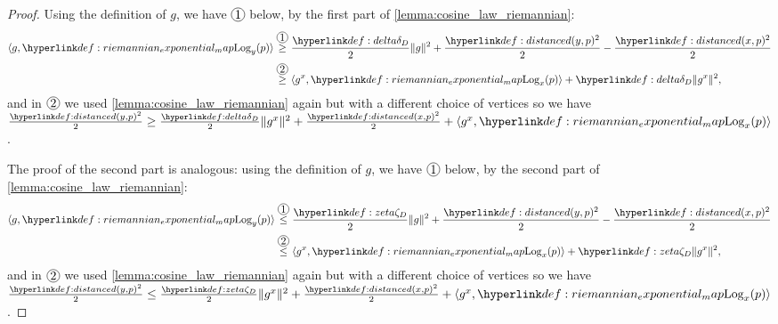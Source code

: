 \documentclass[12pt]{alt2021}
\newcommand{\norm}[1]{\| #1 \|}
\newcommand{\innp}[1]{\langle #1 \rangle}
\begin{document}
\begin{proof}
    Using the definition of $g$, we have $\circled{1}$ below, by the first part of \cref{lemma:cosine_law_riemannian}:
    \begin{align*}
     \begin{aligned}
         \innp{g, \exponinv{y}(p)} &\circled{1}[\geq] \frac{\delta{D}}{2}\norm{g}^2 + \frac{\dist(y, p)^2}{2} - \frac{\dist(x, p)^2}{2} \\
         & \circled{2}[\geq] \innp{g^x, \exponinv{x}(p)} +\delta{D}\norm{g^x}^2,
     \end{aligned}
    \end{align*}
    and in $\circled{2}$ we used \cref{lemma:cosine_law_riemannian} again but with a different choice of vertices so we have $\frac{\dist(y, p)^2}{2} \geq \frac{\delta{D}}{2} \norm{g^x}^2 + \frac{\dist(x, p)^2}{2} + \innp{g^x, \exponinv{x}(p)}$.

    The proof of the second part is analogous: using the definition of $g$, we have $\circled{1}$ below, by the second part of \cref{lemma:cosine_law_riemannian}:
    \begin{align*}
     \begin{aligned}
         \innp{g, \exponinv{y}(p)} &\circled{1}[\leq] \frac{\zeta{D}}{2}\norm{g}^2 + \frac{\dist(y, p)^2}{2} - \frac{\dist(x, p)^2}{2} \\
         & \circled{2}[\leq] \innp{g^x, \exponinv{x}(p)} +\zeta{D}\norm{g^x}^2,
     \end{aligned}
    \end{align*}
    and in $\circled{2}$ we used \cref{lemma:cosine_law_riemannian} again but with a different choice of vertices so we have $\frac{\dist(y, p)^2}{2} \leq  \frac{\zeta{D}}{2} \norm{g^x}^2+ \frac{\dist(x, p)^2}{2} + \innp{g^x, \exponinv{x}(p)}$.
\end{proof}
\end{document}
